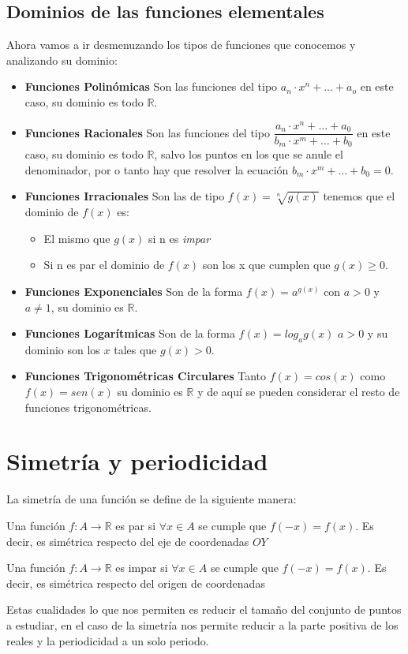 \subsection*{Dominios de las funciones elementales}
\noindent
Ahora vamos a ir desmenuzando los tipos de funciones que conocemos y analizando su dominio:
\begin{itemize}
\item \textbf{Funciones Polinómicas} Son las funciones del tipo $a_n\cdot x^n+\ldots+ a_o$ en este caso, su dominio es todo $\mathbb{R}$.
\item \textbf{Funciones Racionales} Son las funciones del tipo $\displaystyle \dfrac{a_n\cdot x^n+\ldots+ a_0}{b_m\cdot x^m+\ldots+ b_0}$ en este caso, su dominio es todo $\mathbb{R}$, salvo los puntos en los que se anule el denominador, por o tanto hay que resolver la ecuación $b_m\cdot x^m+\ldots+ b_0=0$.
\item \textbf{Funciones Irracionales} Son las de tipo $f(x)=\sqrt[n]{g(x)}$ tenemos que el dominio de $f(x)$ es:
\begin{itemize}
\item El mismo que $g(x)$ si n es \emph{impar}
\item Si n es par el dominio de $f(x)$ son los x que cumplen que  $g(x)\geq 0$. 
\end{itemize}
\item \textbf{Funciones Exponenciales}
Son de la forma $f(x)=a^{g(x)}$ con $a>0$ y $a\neq 1$, su dominio es $\mathbb{R}$.
\item \textbf{Funciones Logarítmicas}
Son de la forma $f(x)=log_a g(x)$ $a>0$ y  su dominio son los $x$ tales que $g(x)>0$.
\item \textbf{Funciones Trigonométricas Circulares} 
Tanto $f(x)=cos(x)$ como $f(x)=sen(x)$ su dominio es $\mathbb{R}$ y de aquí se pueden considerar el resto de funciones trigonométricas. 
\end{itemize}
\section{Simetría y periodicidad}
\noindent
La simetría de una función se define de la siguiente manera:

\begin{defi}
Una función $f:A \longrightarrow \mathbb{R}$ es par si $\forall x \in A$ se cumple que $f(-x)=f(x)$. Es decir, es simétrica respecto del eje de coordenadas $OY$
\end{defi}
\begin{defi}
Una función $f:A \longrightarrow \mathbb{R}$ es impar si $\forall x \in A$ se cumple que $f(-x)=f(x)$. Es decir, es simétrica respecto del origen de coordenadas 
\end{defi}
\noindent
Estas cualidades lo que nos permiten es reducir el tamaño del conjunto de puntos a estudiar, en el caso de la simetría nos permite reducir a la parte positiva de los reales y la periodicidad a un solo periodo. 

